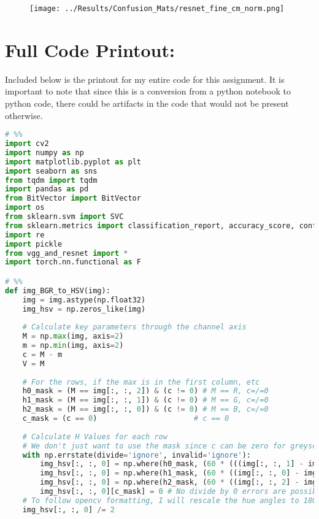 \documentclass{article}
\begin{document}
\begin{figure}[H]
    \centering
    \texttt{[image: ../Results/Confusion\_Mats/resnet\_fine\_cm\_norm.png]}
\end{figure}

\section{Full Code Printout: }
Included below is the printout for my entire code for this assignment. It is important to note that since this is a conversion from a python notebook to python code, there could be artifacts in the code that would not be present otherwise.

\begin{lstlisting}[language=Python]
# %%
import cv2
import numpy as np
import matplotlib.pyplot as plt
import seaborn as sns
from tqdm import tqdm
import pandas as pd
from BitVector import BitVector
import os
from sklearn.svm import SVC
from sklearn.metrics import classification_report, accuracy_score, confusion_matrix
import re
import pickle
from vgg_and_resnet import *
import torch.nn.functional as F

# %%
def img_BGR_to_HSV(img):
    img = img.astype(np.float32)
    img_hsv = np.zeros_like(img)
    
    # Calculate key parameters through the channel axis
    M = np.max(img, axis=2)
    m = np.min(img, axis=2)
    c = M - m
    V = M
    
    # For the rows, if the max is in the first column, etc
    h0_mask = (M == img[:, :, 2]) & (c != 0) # M == R, c=/=0
    h1_mask = (M == img[:, :, 1]) & (c != 0) # M == G, c=/=0
    h2_mask = (M == img[:, :, 0]) & (c != 0) # M == B, c=/=0
    c_mask = (c == 0)                      # c == 0
    
    # Calculate H Values for each row
    # We don't just want to use the mask since c can be zero for greyscale. So we want to only compute on the masks, by checking for where to input values in first.
    with np.errstate(divide='ignore', invalid='ignore'):
        img_hsv[:, :, 0] = np.where(h0_mask, (60 * (((img[:, :, 1] - img[:, :, 0]) / c) % 6)), img_hsv[:, :, 0])
        img_hsv[:, :, 0] = np.where(h1_mask, (60 * ((img[:, :, 0] - img[:, :, 2]) / c + 2)), img_hsv[:, :, 0])
        img_hsv[:, :, 0] = np.where(h2_mask, (60 * ((img[:, :, 2] - img[:, :, 1]) / c + 4)), img_hsv[:, :, 0])
        img_hsv[:, :, 0][c_mask] = 0 # No divide by 0 errors are possible here
    # To follow opencv formatting, I will rescale the hue angles to 180deg instead of 360
    img_hsv[:, :, 0] /= 2
    

\end{lstlisting}
\end{document}
